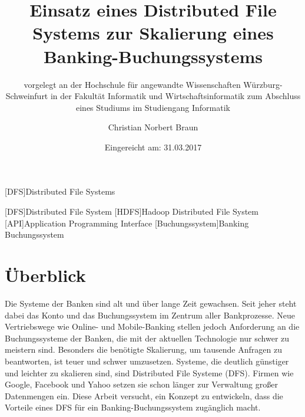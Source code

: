 \documentclass[12pt,oneside,a4paper,parskip]{scrbook}
\newcommand\blankpage{%
    \null
    \thispagestyle{empty}%
    \newpage}
\def\BaAuthor{Christian Norbert Braun}
\def\BaTitle{Einsatz eines Distributed File Systems zur Skalierung eines Banking-Buchungssystems}
\def\BaSupervisorOne{Prof.\ Dr.\ Steffen Heinzl}
\def\BaSupervisorTwo{Prof.\ Dr.\ Peter Braun}
\def\BaDeadline{31.03.2017}
\begin{document}
[DFS]{Distributed File Systems}

\begin{acronym}
  [DFS]{Distributed File System}
  [HDFS]{Hadoop Distributed File System}
  [API]{Application Programming Interface}
  [Buchungssystem]{Banking Buchungssystem}
\end{acronym}




\frontmatter
\titlehead{%
  {Hochschule für angewandte Wissenschaften Würzburg-Schweinfurt\\
   Fakultät Informatik und Wirtschaftsinformatik}}
\subject{Bachelorarbeit}
\title{\BaTitle\\[15mm]}
\subtitle{\normalsize{vorgelegt an der Hochschule f\"{u}r angewandte Wissenschaften W\"{u}rzburg-Schweinfurt in der Fakult\"{a}t Informatik und Wirtschaftsinformatik zum Abschluss eines Studiums im Studiengang Informatik}}
\author{\BaAuthor}
\date{\normalsize{Eingereicht am: \BaDeadline}}
\publishers{
  \normalsize{Erstpr\"{u}fer: \BaSupervisorOne}\\
  \normalsize{Zweitpr\"{u}fer: \BaSupervisorTwo}\\
}


\maketitle
\afterpage{\blankpage}


\chapter*{Überblick}

Die Systeme der Banken sind alt und über lange Zeit gewachsen. Seit jeher steht dabei das Konto und das Buchungssystem im Zentrum aller Bankprozesse. Neue Vertriebswege wie Online- und Mobile-Banking stellen jedoch Anforderung an die Buchungssysteme der Banken, die mit der aktuellen Technologie nur schwer zu meistern sind. Besonders die benötigte Skalierung, um tausende Anfragen zu beantworten, ist teuer und schwer umzusetzen. Systeme, die deutlich günstiger und leichter zu skalieren sind, sind Distributed File Systeme (DFS). Firmen wie Google, Facebook und Yahoo setzen sie schon länger zur Verwaltung großer Datenmengen ein. Diese Arbeit versucht, ein Konzept zu entwickeln, dass die Vorteile eines DFS für ein Banking-Buchungssystem zugänglich macht.
\end{document}
